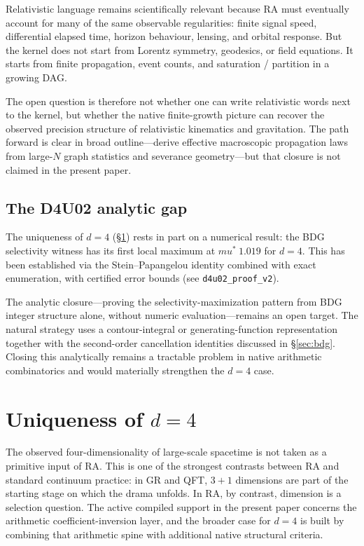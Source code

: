\documentclass[11pt]{article}
\def\mu{mu}%
\def\approx{~}%
\begin{document}
Relativistic language remains scientifically relevant because RA must eventually account for many of the same observable regularities: finite signal speed, differential elapsed time, horizon behaviour, lensing, and orbital response. But the kernel does not start from Lorentz symmetry, geodesics, or field equations. It starts from finite propagation, event counts, and saturation / partition in a growing DAG.

The open question is therefore not whether one can write relativistic words next to the kernel, but whether the native finite-growth picture can recover the observed precision structure of relativistic kinematics and gravitation. The path forward is clear in broad outline---derive effective macroscopic propagation laws from large-$N$ graph statistics and severance geometry---but that closure is not claimed in the present paper.

\subsection{The D4U02 analytic gap}
\label{sec:d4u02_gap}

The uniqueness of $d=4$ (\S\ref{sec:d4}) rests in part on a numerical result: the BDG selectivity witness has its first local maximum at $\mu^*\approx 1.019$ for $d=4$. This has been established via the Stein--Papangelou identity combined with exact enumeration, with certified error bounds (see \texttt{d4u02\_proof\_v2}).

The analytic closure---proving the selectivity-maximization pattern from BDG integer structure alone, without numeric evaluation---remains an open target. The natural strategy uses a contour-integral or generating-function representation together with the second-order cancellation identities discussed in \S\ref{sec:bdg}. Closing this analytically remains a tractable problem in native arithmetic combinatorics and would materially strengthen the $d=4$ case.

\section{Uniqueness of $d=4$}
\label{sec:d4}

The observed four-dimensionality of large-scale spacetime is not taken as a primitive input of RA. This is one of the strongest contrasts between RA and standard continuum practice: in GR and QFT, $3+1$ dimensions are part of the starting stage on which the drama unfolds. In RA, by contrast, dimension is a selection question. The active compiled support in the present paper concerns the arithmetic coefficient-inversion layer, and the broader case for $d=4$ is built by combining that arithmetic spine with additional native structural criteria.
\end{document}

